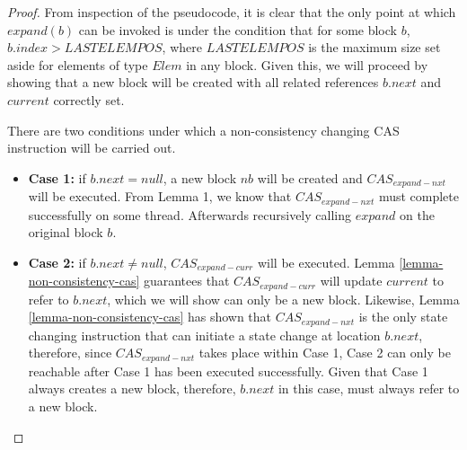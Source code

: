 \documentclass[runningheads,a4paper]{llncs}
\begin{document}
\begin{proof}
%
%

From inspection of the pseudocode, it is clear that the only point at which
$expand(b)$ can be invoked is under the condition that for some block $b$,
$b.index > LASTELEMPOS$, where $LASTELEMPOS$ is the maximum size set aside for
elements of type $Elem$ in any block. Given this, we will proceed  by showing
that a new block will be created with all related references  $b.next$ and
$current$ correctly set.

There are two conditions under which a non-consistency changing CAS
instruction will be carried out. 

\begin{itemize}  \item \textbf{Case 1:} if $b.next=null$, a new block $nb$
will be created and $CAS_{expand-nxt}$ will be executed. From Lemma 1, we know that $CAS_{expand-nxt}$
must complete successfully on some thread. Afterwards recursively calling
$expand$ on the original block $b$. \item \textbf{Case 2:} if $b.next \neq
null$, $CAS_{expand-curr}$ will be executed. Lemma \ref{lemma-non-consistency-cas}
guarantees that $CAS_{expand-curr}$ will update $current$ to refer to $b.next$,  which we
will show can only be a new block. Likewise, Lemma \ref{lemma-non-consistency-cas} 
has shown that  $CAS_{expand-nxt}$ is the only state changing instruction that can
initiate a state change  at location $b.next$, therefore, since $CAS_{expand-nxt}$ takes
place within Case 1,   Case 2 can only be reachable after Case 1 has been
executed successfully. Given  that Case 1 always creates a new block,
therefore, $b.next$ in this case, must  always refer to a new block.
\end{itemize}


\end{proof}
\end{document}
